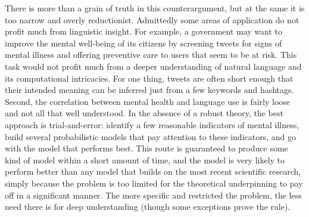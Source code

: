 There is more than a grain of truth in this counterargument, but at the same it is too narrow and overly reductionist.
Admittedly some areas of application do not profit much from linguistic insight.
For example, a government may want to improve the mental well-being of its citizens by screening tweets for signs of mental illness and offering preventive care to users that seem to be at risk.
This task would not profit much from a deeper understanding of natural language and its computational intricacies.
For one thing, tweets are often short enough that their intended meaning can be inferred just from a few keywords and hashtags.
Second, the correlation between mental health and language use is fairly loose and not all that well understood.
In the absence of a robust theory, the best approach is trial-and-error: identify a few reasonable indicators of mental illness, build several probabilistic models that pay attention to these indicators, and go with the model that performs best.
This route is guaranteed to produce some kind of model within a short amount of time, and the model is very likely to perform better than any model that builds on the most recent scientific research, simply because the problem is too limited for the theoretical underpinning to pay off in a significant manner.
The more specific and restricted the problem, the less need there is for deep understanding (though some exceptions prove the rule).


